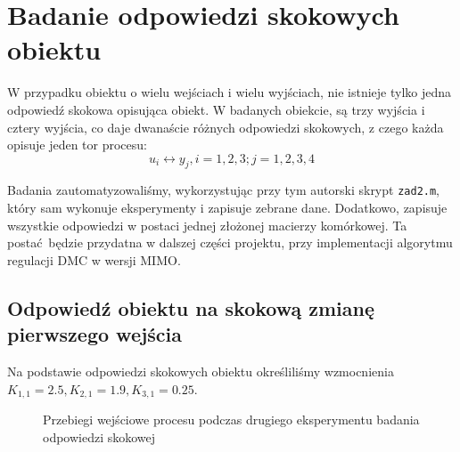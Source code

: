 \chapter{Badanie odpowiedzi skokowych obiektu}
\label{pro2}

W przypadku obiektu o wielu wejściach i wielu wyjściach, nie istnieje tylko jedna
odpowiedź skokowa opisująca obiekt. W badanych obiekcie, są trzy wyjścia i cztery wyjścia,
co daje dwanaście różnych odpowiedzi skokowych, z czego każda opisuje jeden tor procesu:
$$u_{i} \longleftrightarrow y_{j},  i = 1, 2, 3; j = 1, 2, 3, 4$$

Badania zautomatyzowaliśmy, wykorzystując przy tym autorski skrypt \verb+zad2.m+, który sam
wykonuje eksperymenty i zapisuje zebrane dane. Dodatkowo, zapisuje wszystkie odpowiedzi w postaci
jednej złożonej macierzy komórkowej. Ta postać będzie przydatna w dalszej części projektu, przy 
implementacji algorytmu regulacji DMC w wersji MIMO.
\newpage

\section{Odpowiedź obiektu na skokową zmianę pierwszego wejścia}
Na podstawie odpowiedzi skokowych obiektu określiliśmy wzmocnienia \\ \mbox{$K_{\mathrm{1},\mathrm{1}} = \num{2.5},
K_{\mathrm{2},\mathrm{1}} = \num{1.9}, K_{\mathrm{3},\mathrm{1}} = \num{0.25}$.}

\begin{figure}[h]
    \centering
    \caption{Przebiegi wejściowe procesu podczas drugiego eksperymentu badania odpowiedzi skokowej}
    \label{pro2_odp_wej_1}
\end{figure}

